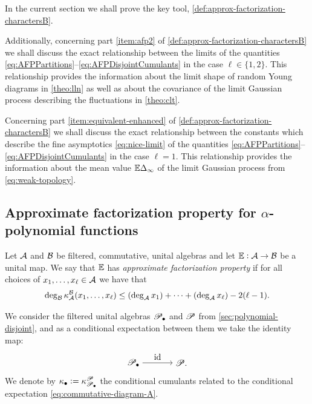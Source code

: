 \documentclass[12pt,usenames,dvipsnames,svgnames,table]{amsart}
\begin{document}
In the current section we shall prove the key tool, \cref{def:approx-factorization-charactersB}.

Additionally, concerning part \ref{item:afp2} of \cref{def:approx-factorization-charactersB} 
we shall discuss the exact relationship between the limits 
of the quantities \eqref{eq:AFPPartitions}--\eqref{eq:AFPDisjointCumulants} 
in the case $\ell\in\{1,2\}$. This relationship provides the information about the limit shape
of random Young diagrams in \cref{theo:lln}
as well as about the covariance of the limit Gaussian process describing the fluctuations
in \cref{theo:clt}.

Concerning part \ref{item:equivalent-enhanced} of \cref{def:approx-factorization-charactersB} 
we shall discuss
the exact relationship between the constants which describe the fine asymptotics
\eqref{eq:nice-limit} of the quantities \eqref{eq:AFPPartitions}--\eqref{eq:AFPDisjointCumulants} 
in the case $\ell=1$.
This relationship provides the information about the mean value $\mathbb{E}\Delta_\infty$ 
of the limit Gaussian process from \cref{eq:weak-topology}.

\subsection{Approximate factorization property for $\alpha$-polynomial functions}
\begin{definition}
	Let $\mathcal{A}$ and $\mathcal{B}$ be filtered, commutative, unital algebras 
	and let $\mathbb{E}:\mathcal{A}\rightarrow\mathcal{B}$ be a 
	unital map.
	We say that $\mathbb{E}$ has \emph{approximate factorization property}
	if for all choices of $x_1,\dots,x_\ell\in\mathcal{A}$ we have that 
	\begin{equation}
	\label{eq:approximate-factorization-property}
	\deg_{\mathcal{B}} \kappa_{\mathcal{A}}^{\mathcal{B}}(x_1,\dots,x_\ell) \leq \left( \deg_{\mathcal{A}} x_1 \right) + \cdots + \left( \deg_{\mathcal{A}} x_\ell \right)- 2(\ell-1).    
	\end{equation}
\end{definition}

We consider the filtered unital algebras $\mathscr{P}_\bullet$ and
$\mathscr{P}$ from \cref{sec:polynomial-disjoint}, 
and as a conditional expectation between them we take the identity map:
\tikzexternaldisable
\begin{equation}
\label{eq:commutative-diagram-A}
\begin{tikzpicture}[node distance=2cm, auto, baseline=-0.8ex]
\node (A) {$\Poly_\disjoint$};
\node (B) [right of=A] {$\Poly.$};

\draw[->] (A) to node {$\id$} (B);
\end{tikzpicture}
\end{equation}
\tikzexternalenable
We denote by $\kappa_{\bullet}:=\kappa_{\mathscr{P}_\bullet}^{\mathscr{P}}$ the conditional cumulants
related to the conditional expectation \eqref{eq:commutative-diagram-A}.
\end{document}
